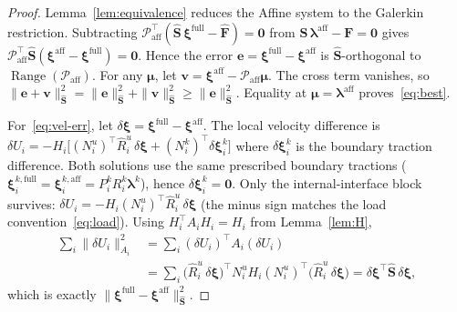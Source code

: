 \documentclass[11pt,a4paper]{article}
\newcommand{\trac}{\bm{\lambda}}
\newcommand{\Schur}{\mathbf{S}}
\newcommand{\zero}{\bm{0}}
\newcommand{\Range}{\operatorname{Range}}
\begin{document}
\begin{proof}
  Lemma~\ref{lem:equivalence} reduces the Affine system to the Galerkin
  restriction.  Subtracting
  $\mathcal{P}_{\text{aff}}^\top(\widehat{\Schur}\,\bm{\xi}^{\text{full}}
   - \widehat{\bm{F}}) = \zero$
  from $\Schur\,\trac^{\text{aff}} - \bm{F} = \zero$ gives
  $\mathcal{P}_{\text{aff}}^\top\widehat{\Schur}
   (\bm{\xi}^{\text{aff}} - \bm{\xi}^{\text{full}}) = \zero$.
  Hence the error $\bm{e} = \bm{\xi}^{\text{full}} - \bm{\xi}^{\text{aff}}$
  is $\widehat{\Schur}$-orthogonal to
  $\Range(\mathcal{P}_{\text{aff}})$.
  For any $\bm{\mu}$, let $\bm{v} = \bm{\xi}^{\text{aff}}
   - \mathcal{P}_{\text{aff}}\bm{\mu}$.
  The cross term vanishes, so
  $\|\bm{e}+\bm{v}\|_{\widehat{\Schur}}^2
   = \|\bm{e}\|_{\widehat{\Schur}}^2
     + \|\bm{v}\|_{\widehat{\Schur}}^2
   \ge \|\bm{e}\|_{\widehat{\Schur}}^2$.
  Equality at $\bm{\mu} = \trac^{\text{aff}}$ proves~\eqref{eq:best}.

  For~\eqref{eq:vel-err}, let $\delta\bm{\xi}
   = \bm{\xi}^{\text{full}} - \bm{\xi}^{\text{aff}}$.
  The local velocity difference is
  $\delta U_i = -H_i\bigl[(N_i^u)^\top \widehat{R}_i^u\,
    \delta\bm{\xi} + (N_i^k)^\top \delta\bm{\xi}_i^k\bigr]$
  where $\delta\bm{\xi}_i^k$ is the boundary traction difference.
  Both solutions use the same prescribed boundary tractions
  ($\bm{\xi}_i^{k,\text{full}} = \bm{\xi}_i^{k,\text{aff}}
   = P_i^k R_i^k \trac^k$), hence $\delta\bm{\xi}_i^k = \bm{0}$.
  Only the internal-interface block survives:
  $\delta U_i = -H_i (N_i^u)^\top \widehat{R}_i^u\,\delta\bm{\xi}$
  (the minus sign matches the load convention~\eqref{eq:load}).
  Using $H_i^\top A_i H_i = H_i$ from Lemma~\ref{lem:H},
  \begin{align*}
    \sum_i \|\delta U_i\|_{A_i}^2
    &= \sum_i (\delta U_i)^\top A_i (\delta U_i) \\
    &= \sum_i \bigl(\widehat{R}_i^u\,\delta\bm{\xi}\bigr)^\top
       N_i^u H_i (N_i^u)^\top
       \bigl(\widehat{R}_i^u\,\delta\bm{\xi}\bigr)
     = \delta\bm{\xi}^\top \widehat{\Schur}\,\delta\bm{\xi},
  \end{align*}
  which is exactly $\|\bm{\xi}^{\text{full}}
   - \bm{\xi}^{\text{aff}}\|_{\widehat{\Schur}}^2$.
\end{proof}
\end{document}
